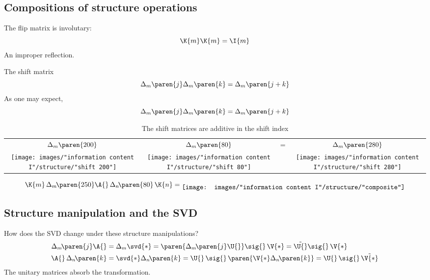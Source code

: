 \subsection{Compositions of structure operations}
The flip matrix is involutary:
\begin{equation}
  \K{m} \K{m} = \I{m}
\end{equation}
An improper reflection.

The shift matrix
\begin{equation}
  \Delta_{m}\paren{j}\Delta_{m}\paren{k} = \Delta_{m}\paren{j+k}
\end{equation}
As one may expect, 
%
\begin{equation}
  \Delta_{m}\paren{j} \Delta_{m}\paren{k} = \Delta_{m}\paren{j+k}
\end{equation}
%
\begin{table}[htdp]
\caption{The shift matrices are additive in the shift index}
\begin{center}
\begin{tabular}{cccc}
%
  $\Delta_{m}\paren{200}$ & $\Delta_{m}\paren{80}$ &=& $\Delta_{m}\paren{280}$ \\
%
  \texttt{[image: images/"information content I"/structure/"shift 200"]} &
  \texttt{[image: images/"information content I"/structure/"shift 80"]} &&
  \texttt{[image: images/"information content I"/structure/"shift 280"]}
%
\end{tabular}
\end{center}
\label{tab:structure:shifts add}
\end{table}%

\begin{equation}
  \K{m}\, \Delta_{m}\!\paren{250} \A{}\, \Delta_{n}\!\paren{80}\, \K{n} =
  \raisebox{-0.5\height}{\texttt{[image: images/"information content I"/structure/"composite"]}}
\end{equation}

\subsection{Structure manipulation and the SVD}
How does the SVD change under these structure manipulations?
\begin{equation}
  \begin{split}
    \Delta_{m}\!\paren{j} \A{}  &= \Delta_{m} \svd{*} = \paren{\Delta_{m}\!\paren{j} \U{}} \sig{} \, \V{*} = \tilde{\U{}} \sig{} \, \V{*}\\
    \A{}\, \Delta_{n}\!\paren{k}  &= \svd{*}\Delta_{n}\!\paren{k} = \U{} \, \sig{} \, \paren{\V{*}\Delta_{n}\!\paren{k}} = \U{} \, \sig{} \, \tilde{\V{*}}
  \end{split}
\end{equation}
The unitary matrices absorb the transformation.


\endinput